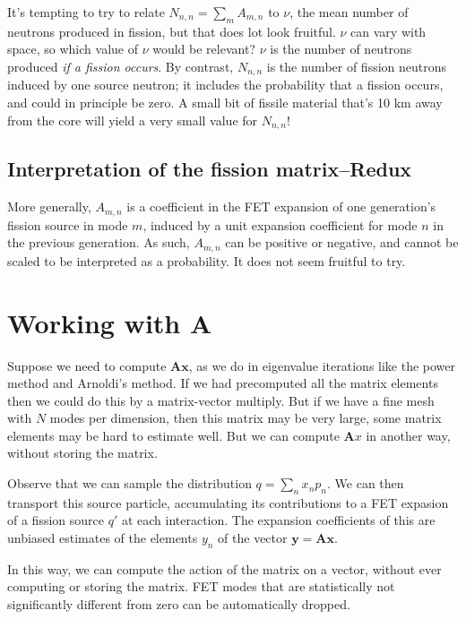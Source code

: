\documentclass[11pt,onecolumn]{article}
\newcommand{\FM}{\mathbf{A}}
\newcommand{\x}{\mathbf{x}}
\begin{document}
It's tempting to try to relate $N_{n,n} = {\sum_m A_{m,n}}$ to $\nu$, the mean number of neutrons produced in fission, but that does lot look fruitful.  $\nu$ can vary with space, so which value of $\nu$ would be relevant?  $\nu$ is the number of neutrons produced \emph{if a fission occurs}.  By contrast, $N_{n,n}$ is the number of fission neutrons induced by one source neutron; it includes the probability that a fission occurs, and could in principle be zero.  A small bit of fissile material that's 10 km away from the core will yield a very small value for $N_{n,n}$!

\subsection{Interpretation of the fission matrix--Redux}

More generally, $A_{m,n}$ is a coefficient in the FET expansion of one generation's fission source in mode $m$, induced by a unit expansion coefficient for mode $n$ in the previous generation.   As such, $A_{m,n}$ can be positive or negative, and cannot be scaled to be interpreted as a probability.  It does not seem fruitful to try.

\section{Working with $\FM$}

Suppose we need to compute $\FM \x$, as we do in eigenvalue iterations like the power method and Arnoldi's method.  If we had precomputed all the matrix elements then we could do this by a matrix-vector multiply.  But if we have a fine mesh with $N$ modes per dimension, then this matrix may be very large, some matrix elements may be hard to estimate well.  But we can compute $\FM x$ in another way, without storing the matrix.

Observe that we can sample the distribution $q = \sum_n x_n p_n$.  We can then transport this source particle, accumulating its contributions to a FET expasion of a fission source $q'$ at each interaction.  The expansion coefficients of this are unbiased estimates of the elements $y_n$ of the vector $\mathbf{y} = \FM \x$.  

In this way, we can compute the action of the matrix on a vector, without ever computing or storing the matrix.  FET modes that are statistically not significantly different from zero can be automatically dropped.
\end{document}
